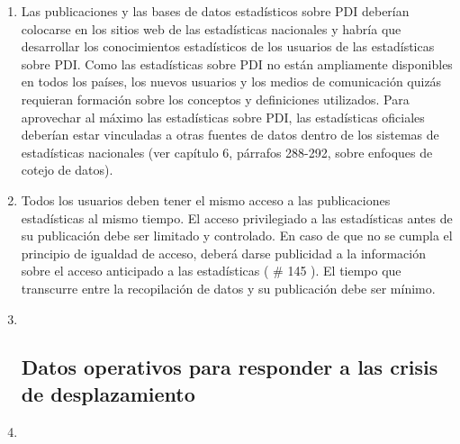 \documentclass[
]{book}
\begin{document}
\begin{enumerate}
\item
  Las publicaciones y las bases de datos estadísticos sobre PDI deberían colocarse en los sitios web de las estadísticas nacionales y habría que desarrollar los conocimientos estadísticos de los usuarios de las estadísticas sobre PDI. Como las estadísticas sobre PDI no están ampliamente disponibles en todos los países, los nuevos usuarios y los medios de comunicación quizás requieran formación sobre los conceptos y definiciones utilizados. Para aprovechar al máximo las estadísticas sobre PDI, las estadísticas oficiales deberían estar vinculadas a otras fuentes de datos dentro de los sistemas de estadísticas nacionales (ver capítulo 6, párrafos 288-292, sobre enfoques de cotejo de datos).
\item
  Todos los usuarios deben tener el mismo acceso a las publicaciones estadísticas al mismo tiempo. El acceso privilegiado a las estadísticas antes de su publicación debe ser limitado y controlado. En caso de que no se cumpla el principio de igualdad de acceso, deberá darse publicidad a la información sobre el acceso anticipado a las estadísticas (
  \# 145
  ). El tiempo que transcurre entre la recopilación de datos y su publicación debe ser mínimo.
\item ~
  \hypertarget{datos-operativos-para-responder-a-las-crisis-de-desplazamiento}{%
  \subsection{Datos operativos para responder a las crisis de desplazamiento}\label{datos-operativos-para-responder-a-las-crisis-de-desplazamiento}}
\item ~
  \hypertarget{coordinaciuxf3n-de-datos-operativos-sobre-pdi}{%
}
\end{enumerate}
\end{document}
